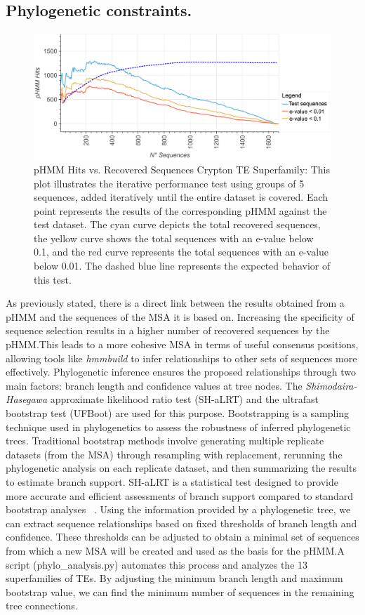 \documentclass[unnumsec,webpdf,contemporary,large]{oup-authoring-template}%
\theoremstyle{thmstyleone}%
\theoremstyle{thmstyletwo}%
\theoremstyle{thmstylethree}%
\begin{document}
\subsection{Phylogenetic constraints.}\label{subsec3_3}
\begin{figure}[t]%
\centering
\includegraphics[width=\textwidth]{figs/best_msa.eps}
\caption{pHMM Hits vs. Recovered Sequences Crypton TE Superfamily: This plot
illustrates the iterative performance test using groups of 5 sequences, added
iteratively until the entire dataset is covered. Each point represents the
results of the corresponding pHMM against the test dataset. The cyan curve
depicts the total recovered sequences, the yellow curve shows the total
sequences with an e-value below 0.1, and the red curve represents the total
sequences with an e-value below 0.01. The dashed blue line represents the
expected behavior of this test.}\label{fig:image3}
\end{figure}
As previously stated, there is a direct link between the results obtained from a
pHMM and the sequences of the MSA it is based on. Increasing the specificity of
sequence selection results in a higher number of recovered sequences by the
pHMM.\@ This leads to a more cohesive MSA in terms of useful consensus
positions, allowing tools like \textit{hmmbuild} to infer relationships to other
sets of sequences more effectively. Phylogenetic inference ensures the proposed
relationships through two main factors: branch length and confidence values at
tree nodes. The \textit{Shimodaira{-}Hasegawa} approximate likelihood ratio test
(SH-aLRT) and the ultrafast bootstrap test (UFBoot) are used for this purpose.
Bootstrapping is a sampling technique used in phylogenetics to assess the
robustness of inferred phylogenetic trees. Traditional bootstrap methods involve
generating multiple replicate datasets (from the MSA) through resampling with
replacement, rerunning the phylogenetic analysis on each replicate dataset, and
then summarizing the results to estimate branch support. SH-aLRT is a
statistical test designed to provide more accurate and efficient assessments of
branch support compared to standard bootstrap analyses
~\cite{shimodaira_multiple_1999,guindon_new_2010}. Using the information
provided by a phylogenetic tree, we can extract sequence relationships based on
fixed thresholds of branch length and confidence. These thresholds can be
adjusted to obtain a minimal set of sequences from which a new MSA will be
created and used as the basis for the pHMM.\@ A script (phylo\_analysis.py)
automates this process and analyzes the 13 superfamilies of TEs. By adjusting
the minimum branch length and maximum bootstrap value, we can find the minimum
number of sequences in the remaining tree connections.
\end{document}
